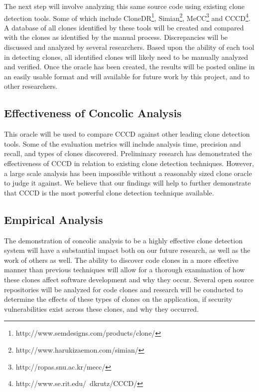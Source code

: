 \documentclass{article}
\begin{document}
The next step will involve analyzing this same source code using existing clone detection tools. Some of which include CloneDR\footnote{http://www.semdesigns.com/products/clone/}, Simian\footnote{http://www.harukizaemon.com/simian/}, MeCC\footnote{http://ropas.snu.ac.kr/mecc/} and CCCD\footnote{http://www.se.rit.edu/~dkrutz/CCCD/}. A database of all clones identified by these tools will be created and compared with the clones as identified by the manual process. Discrepancies will be discussed and analyzed by several researchers. Based upon the ability of each tool in detecting clones, all identified clones will likely need to be manually analyzed and verified. %
Once the oracle has been created, the results will be posted online in an easily usable format and will available for future work by this project, and to other researchers.

\subsection{Effectiveness of Concolic Analysis}
This oracle will be used to compare CCCD against other leading clone detection tools. Some of the evaluation metrics will include analysis time, precision and recall, and types of clones discovered. Preliminary research has demonstrated the effectiveness of CCCD in relation to existing clone detection techniques. However, a large scale analysis has been impossible without a reasonably sized clone oracle to judge it against. We believe that our findings will help to further demonstrate that CCCD is the most powerful clone detection technique available.



\subsection{Empirical Analysis}

The demonstration of concolic analysis to be a highly effective clone detection system will have a substantial impact both on our future research, as well as the work of others as well. The ability to discover code clones in a more effective manner than previous techniques will allow for a thorough examination of how these clones affect software development and why they occur. Several open source repositories will be analyzed for code clones and research will be conducted to determine the effects of these types of clones on the application, if security vulnerabilities exist across these clones, and why they occurred.
\end{document}
